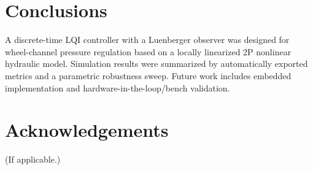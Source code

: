 \documentclass[a4paper]{ifacconf}
\begin{document}
\section{Conclusions}
A discrete-time LQI controller with a Luenberger observer was designed for wheel-channel pressure regulation based on a locally linearized 2P nonlinear hydraulic model. Simulation results were summarized by automatically exported metrics and a parametric robustness sweep. Future work includes embedded implementation and hardware-in-the-loop/bench validation.

\section*{Acknowledgements}
 (If applicable.)



\end{document}
